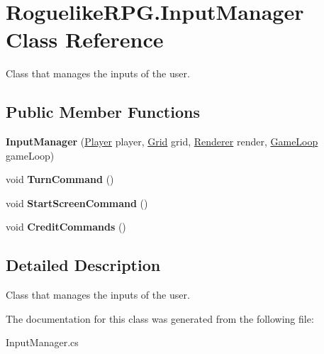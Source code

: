 \hypertarget{class_roguelike_r_p_g_1_1_input_manager}{}\section{Roguelike\+R\+P\+G.\+Input\+Manager Class Reference}
\label{class_roguelike_r_p_g_1_1_input_manager}


Class that manages the inputs of the user.  


\subsection*{Public Member Functions}
\begin{DoxyCompactItemize}
\item 
\mbox{\label{class_roguelike_r_p_g_1_1_input_manager_a6b5636c23b08dcafec8911b76155aacb}} 
{\bfseries Input\+Manager} (\mbox{\hyperlink{class_roguelike_r_p_g_1_1_player}{Player}} player, \mbox{\hyperlink{class_roguelike_r_p_g_1_1_grid}{Grid}} grid, \mbox{\hyperlink{class_roguelike_r_p_g_1_1_renderer}{Renderer}} render, \mbox{\hyperlink{class_roguelike_r_p_g_1_1_game_loop}{Game\+Loop}} game\+Loop)
\item 
\mbox{\label{class_roguelike_r_p_g_1_1_input_manager_a4cf1240d67c0b5f014eb44a752bd973e}} 
void {\bfseries Turn\+Command} ()
\item 
\mbox{\label{class_roguelike_r_p_g_1_1_input_manager_aec0961d74c0742a206f3e0af0cafd2f7}} 
void {\bfseries Start\+Screen\+Command} ()
\item 
\mbox{\label{class_roguelike_r_p_g_1_1_input_manager_a320b37790da7ab766eb987471c893a2a}} 
void {\bfseries Credit\+Commands} ()
\end{DoxyCompactItemize}


\subsection{Detailed Description}
Class that manages the inputs of the user. 



The documentation for this class was generated from the following file\+:\begin{DoxyCompactItemize}
\item 
Input\+Manager.\+cs\end{DoxyCompactItemize}
